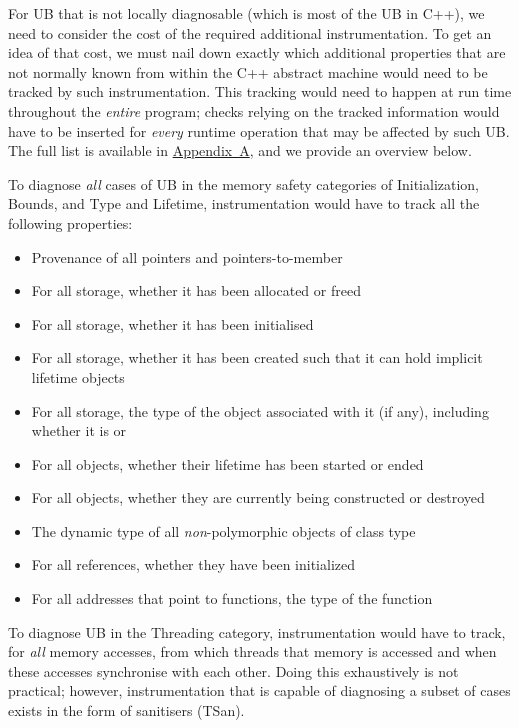 For UB that is not locally diagnosable (which is most of the UB in C++), we need to consider the cost of the required additional instrumentation. To get an idea of that cost, we must nail down exactly which additional properties that are not normally known from within the C++ abstract machine would need to be tracked by such instrumentation. This tracking would need to happen at run time throughout the \emph{entire} program; checks relying on the tracked information would have to be inserted for \emph{every} runtime operation that may be affected by such UB.
The full list is available in \hyperref[appendix]{Appendix~A}, and we provide an overview below.

To diagnose \emph{all} cases of UB in the memory safety categories of Initialization, Bounds, and Type and Lifetime, instrumentation would have to track all the following properties:

\begin{itemize}
\item Provenance of all pointers and pointers-to-member
\item For all storage, whether it has been allocated or freed
\item For all storage, whether it has been initialised
\item For all storage, whether it has been created such that it can hold implicit lifetime objects
\item For all storage, the type of the object associated with it (if any), including whether it is  or 
\item For all objects, whether their lifetime has been started or ended
\item For all objects, whether they are currently being constructed or destroyed
\item The dynamic type of all \emph{non}-polymorphic objects of class type
\item For all references, whether they have been initialized
\item For all addresses that point to  functions, the type of the function
\end{itemize}

To diagnose UB in the Threading category, instrumentation would have to track, for \emph{all} memory accesses, from which threads that memory is accessed and when these accesses synchronise with each other. Doing this exhaustively is not practical; however, instrumentation that is capable of diagnosing a subset of cases exists in the form of sanitisers (TSan).

